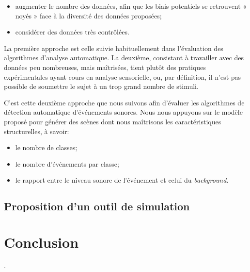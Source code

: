 \begin{itemize}
\item augmenter le nombre des données, afin que les biais potentiels se retrouvent « noyés » face à la diversité des données proposées;
\item considérer des données très contrôlées.
\end{itemize}

La première approche est celle suivie habituellement dans l'évaluation des algorithmes d'analyse automatique. La deuxième, consistant à travailler avec des données peu nombreuses, mais maîtrisées, tient plutôt des pratiques expérimentales ayant cours en analyse sensorielle, ou, par définition, il n'est pas possible de soumettre le sujet à un trop grand nombre de stimuli.

C'est cette deuxième approche que nous suivons afin d'évaluer les algorithmes de détection automatique d'événements sonores. Nous nous appuyons sur le modèle proposé pour générer des scènes dont nous maîtrisons les caractéristiques structurelles, à savoir:

\begin{itemize}
\item le nombre de classes;
\item le nombre d'événements par classe;
\item le rapport entre le niveau sonore de l'événement et celui du \emph{background}. 
\end{itemize}

\subsection{Proposition d'un outil de simulation}
\label{sec:ch4_simsceneMatlab}


\section{Conclusion}



.

